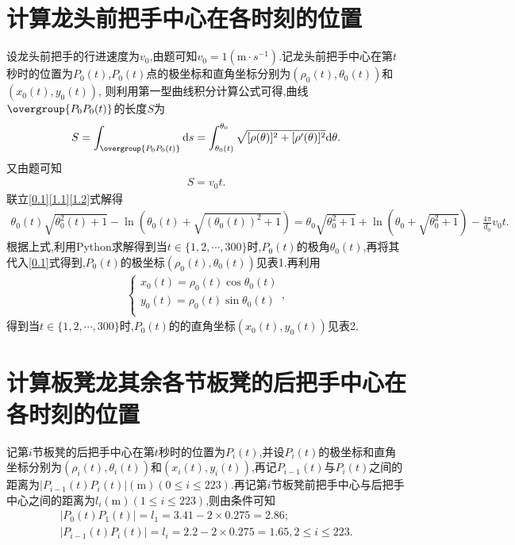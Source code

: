 \documentclass[lang=cn,newtx,10pt,scheme=chinese]{../Template/elegantbook}
\begin{document}
\section{计算龙头前把手中心在各时刻的位置}\label{1.(2)}

设龙头前把手的行进速度为\(v_0\),由题可知\(v_0 = 1(\mathrm{m}\cdot s^{-1})\).记龙头前把手中心在第\(t\)秒时的位置为\(P_0(t)\),\(P_0(t)\)点的极坐标和直角坐标分别为\((\rho _0(t),\theta _0(t))\)和\((x_0(t),y_0(t))\),
则利用第一型曲线积分计算公式可得,曲线\(\overgroup{P_0P_0(t)}\)的长度\(S\)为
\begin{align}
S=\int_{\overgroup{P_0P_0(t)}}{\mathrm{d}s}=\int_{\theta _0(t)}^{\theta _0}{\sqrt{[\rho (\theta )]^2+[\rho ' (\theta )]^2}\mathrm{d}\theta}.\label{1.1}
\end{align}
又由题可知
\begin{align}
S = v_0t.\label{1.2}
\end{align}
联立\eqref{0.1}\eqref{1.1}\eqref{1.2}式解得
\begin{align}
\theta _0(t)\sqrt{\theta _{0}^{2}(t)+1}-\ln (\theta _0(t)+\sqrt{(\theta _0(t))^2+1}) =\theta _0\sqrt{\theta _{0}^{2}+1}+\ln (\theta _0+\sqrt{\theta _{0}^{2}+1}) -\frac{4\pi}{d_0}v_0t .
\end{align}
根据上式,利用Python求解得到当\(t\in \{ 1,2,\cdots ,300 \}\)时,\(P_0(t)\)的极角\(\theta _0(t)\),再将其代入\eqref{0.1}式得到,\(P_0(t)\)的极坐标\((\rho _0(t),\theta _0(t))\)见表1.再利用
\begin{align}
\begin{cases}
x_0(t)=\rho _0(t)\cos \theta _0(t)\\
y_0(t)=\rho _0(t)\sin \theta _0(t)\\
\end{cases},
\end{align}
得到当\(t\in \{ 1,2,\cdots ,300 \}\)时,\(P_0(t)\)的的直角坐标\((x_0(t),y_0(t))\)见表2.

\section{计算板凳龙其余各节板凳的后把手中心在各时刻的位置}

记第\(i\)节板凳的后把手中心在第\(t\)秒时的位置为\(P_{i}(t)\),并设\(P_{i}(t)\)的极坐标和直角坐标分别为\((\rho _{i}(t),\theta _{i}(t))\)和\((x_{i}(t),y_{i}(t))\),再记\(P_{i-1}(t)\)与\(P_{i}(t)\)之间的距离为\(| P_{i-1}(t)P_{i}(t)|(\mathrm{m}) (0\leqslant i\leqslant 223)\).再记第$i$节板凳前把手中心与后把手中心之间的距离为\(l_i(\mathrm{m})(1\leq i\leq 223)\),则由条件可知
\begin{gather}
| P_0(t)P_1(t)| = l_1 = 3.41 - 2\times 0.275 = 2.86;
\\
| P_{i-1}(t)P_{i}(t)| = l_i = 2.2 - 2\times 0.275 = 1.65,2\leqslant i\leqslant 223.
\end{gather}
\end{document}
